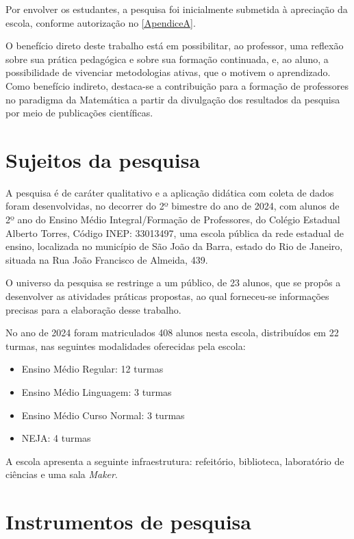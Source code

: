 Por envolver os estudantes, a pesquisa foi inicialmente submetida à apreciação da escola, conforme autorização no \autoref{ApendiceA}.

O benefício direto deste trabalho está em possibilitar, ao professor, uma reflexão sobre sua prática pedagógica e sobre sua formação continuada,  e, ao aluno, a possibilidade de vivenciar metodologias ativas, que o motivem o aprendizado. Como benefício indireto, destaca-se a contribuição para a formação de professores no paradigma da Matemática a partir da divulgação dos resultados da pesquisa por meio de publicações científicas.

\section{Sujeitos da pesquisa}

A pesquisa é de caráter qualitativo e a aplicação didática com coleta de dados foram desenvolvidas, no decorrer do 2º bimestre do ano de 2024, com alunos de 2º ano do Ensino Médio Integral/Formação de Professores, do Colégio Estadual Alberto Torres, Código INEP: 33013497, uma escola pública da rede estadual de ensino, localizada no município de São João da Barra, estado do Rio de Janeiro, situada na Rua João Francisco de Almeida, 439.

O universo da pesquisa se restringe a um público, de 23 alunos, que se propôs a desenvolver as atividades práticas propostas, ao qual forneceu-se informações precisas para a elaboração desse trabalho.

No ano de 2024 foram matriculados 408 alunos nesta escola, distribuídos em 22 turmas, nas seguintes modalidades oferecidas pela escola:

\begin{itemize}
    \item Ensino Médio Regular: 12 turmas
    \item Ensino Médio Linguagem: 3 turmas
    \item Ensino Médio Curso Normal: 3 turmas
    \item NEJA: 4 turmas
\end{itemize}

A escola apresenta a seguinte infraestrutura: refeitório, biblioteca, laboratório de ciências e uma sala \textit{Maker}.

\section{Instrumentos de pesquisa}

